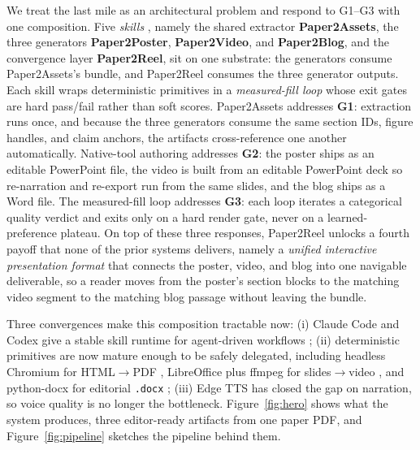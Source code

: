 \documentclass{article}
\begin{document}
We treat the last mile as an architectural problem and respond to G1--G3 with one composition. Five \emph{skills} \citep{anthropic2025claudecode, anthropic2025skills}, namely the shared extractor \textbf{Paper2Assets}, the three generators \textbf{Paper2Poster}, \textbf{Paper2Video}, and \textbf{Paper2Blog}, and the convergence layer \textbf{Paper2Reel}, sit on one substrate: the generators consume Paper2Assets's bundle, and Paper2Reel consumes the three generator outputs. Each skill wraps deterministic primitives in a \emph{measured-fill loop} whose exit gates are hard pass/fail rather than soft scores. Paper2Assets addresses \textbf{G1}: extraction runs once, and because the three generators consume the same section IDs, figure handles, and claim anchors, the artifacts cross-reference one another automatically. Native-tool authoring addresses \textbf{G2}: the poster ships as an editable PowerPoint file, the video is built from an editable PowerPoint deck so re-narration and re-export run from the same slides, and the blog ships as a Word file. The measured-fill loop addresses \textbf{G3}: each loop iterates a categorical quality verdict and exits only on a hard render gate, never on a learned-preference plateau. On top of these three responses, Paper2Reel unlocks a fourth payoff that none of the prior systems delivers, namely a \emph{unified interactive presentation format} that connects the poster, video, and blog into one navigable deliverable, so a reader moves from the poster's section blocks to the matching video segment to the matching blog passage without leaving the bundle.

Three convergences make this composition tractable now: (i) Claude Code \citep{anthropic2025claudecode} and Codex \citep{openai2025codex} give a stable skill runtime for agent-driven workflows \citep{anthropic2025skills, anthropic2024toolUse}; (ii) deterministic primitives are now mature enough to be safely delegated, including headless Chromium for HTML$\to$PDF \citep{playwright}, LibreOffice plus ffmpeg for slides$\to$video \citep{libreoffice, ffmpeg}, and python-docx for editorial \texttt{.docx} \citep{pythondocx}; (iii) Edge TTS \citep{edgetts} has closed the gap on narration, so voice quality is no longer the bottleneck.
Figure~\ref{fig:hero} shows what the system produces, three editor-ready artifacts from one paper PDF, and Figure~\ref{fig:pipeline} sketches the pipeline behind them. 
\end{document}
